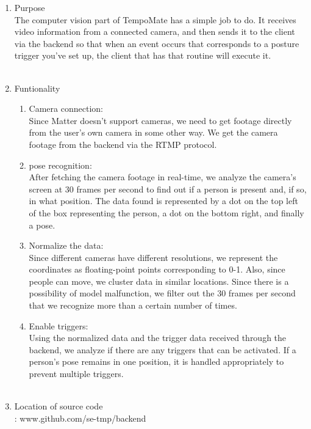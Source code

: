 \begin{enumerate}
      \item Purpose\\
            The computer vision part of TempoMate has a simple job to do.
            It receives video information from a connected camera, and then sends it to the client via the backend so that when an event occurs that corresponds to a posture trigger you've set up, the client that has that routine will execute it.\\\\

      \item Funtionality\\
            \begin{enumerate}
                  \item Camera connection:\\
                        Since Matter doesn't support cameras, we need to get footage directly from the user's own camera in some other way. We get the camera footage from the backend via the RTMP protocol.\\

                  \item pose recognition:\\
                        After fetching the camera footage in real-time, we analyze the camera's screen at 30 frames per second to find out if a person is present and, if so, in what position. The data found is represented by a dot on the top left of the box representing the person, a dot on the bottom right, and finally a pose.\\

                  \item Normalize the data:\\
                        Since different cameras have different resolutions, we represent the coordinates as floating-point points corresponding to 0-1. Also, since people can move, we cluster data in similar locations. Since there is a possibility of model malfunction, we filter out the 30 frames per second that we recognize more than a certain number of times.\\

                  \item Enable triggers:\\
                        Using the normalized data and the trigger data received through the backend, we analyze if there are any triggers that can be activated. If a person's pose remains in one position, it is handled appropriately to prevent multiple triggers.\\\\
            \end{enumerate}
      \item Location of source code \\
            : www.github.com/se-tmp/backend \\\\


\end{enumerate}
